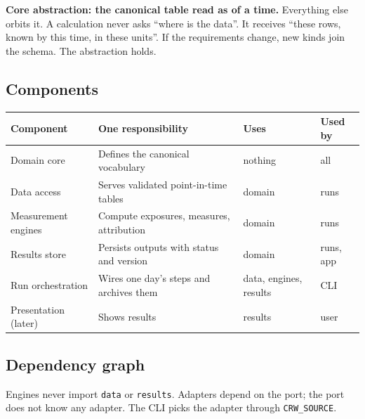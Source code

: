 \documentclass[11pt,a4paper]{article}
\newcommand{\code}[1]{\texttt{\small #1}}
\begin{document}
\textbf{Core abstraction: the canonical table read as of a time.} Everything else orbits it. A calculation never asks ``where is the data''. It receives ``these rows, known by this time, in these units''. If the requirements change, new kinds join the schema. The abstraction holds.

\subsection{Components}
\begin{center}\small
\begin{tabularx}{\linewidth}{@{}lXll@{}}\toprule
Component & One responsibility & Uses & Used by \\\midrule
Domain core & Defines the canonical vocabulary & nothing & all \\
Data access & Serves validated point-in-time tables & domain & runs \\
Measurement engines & Compute exposures, measures, attribution & domain & runs \\
Results store & Persists outputs with status and version & domain & runs, app \\
Run orchestration & Wires one day's steps and archives them & data, engines, results & CLI \\
Presentation (later) & Shows results & results & user \\\bottomrule
\end{tabularx}
\end{center}

\subsection{Dependency graph}
\begin{center}
\end{center}
Engines never import \code{data} or \code{results}. Adapters depend on the port; the port does not know any adapter. The CLI picks the adapter through \code{CRW\_SOURCE}.
\end{document}
